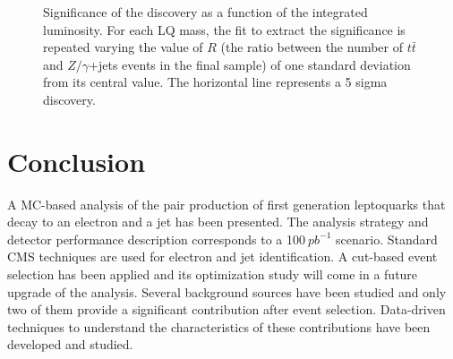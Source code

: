 \documentclass{cmspaper}
\begin{document}
\begin{linenumbers}
 \begin{figure}
   \begin{center}
     \caption{Significance of the discovery as a function of the integrated luminosity.
       For each LQ mass, the fit to extract the significance is repeated varying the value of $R$
       (the ratio between the number of $t\bar{t}$ and $Z/\gamma$+jets events in the final sample)
       of one standard deviation from its central value. 
       The horizontal line represents a 5 sigma discovery.}
     \label{fig:sign_vs_Lint_sysR}
   \end{center}
 \end{figure}


\section{Conclusion}

A MC-based analysis of the pair production of first generation leptoquarks that decay to
an electron and a jet has been presented.
The analysis strategy and detector performance description corresponds to a 100$~pb^{-1}$ scenario.
Standard CMS techniques are used for electron and jet identification. 
A cut-based event selection has been applied and its optimization study will come in a future upgrade
of the analysis.
Several background sources have been studied and only two of them provide a significant contribution
after event selection. 
Data-driven techniques to understand the characteristics of these contributions have been developed 
and studied.


\end{linenumbers}
\end{document}
